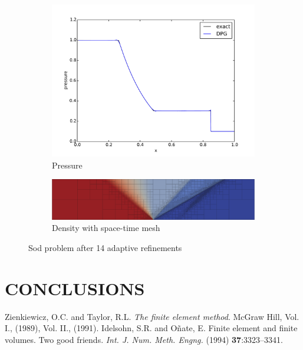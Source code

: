\documentclass{parcfd2014}
\begin{document}
\begin{figure}[h]
\begin{subfigure}[c]{0.3\textwidth}
\includegraphics[width=\textwidth]{figs/Sod1e-5/pres15.pdf}
\caption{Pressure}
\label{fig:sod_pres14}
\end{subfigure}
\begin{subfigure}[c]{0.9\textwidth}
\centering
\includegraphics[width=\textwidth]{figs/Sod1e-5/mesh15.png}
\caption{Density with space-time mesh}
\label{fig:sod_mesh14}
\end{subfigure}
\caption{Sod problem after 14 adaptive refinements}
\label{fig:sod}
\end{figure}


\section{CONCLUSIONS}



\begin{thebibliography}{99}
  Zienkiewicz, O.C. and  Taylor, R.L. \textit{The finite element method}. McGraw Hill,
Vol. I., (1989), Vol. II., (1991).
 Idelsohn, S.R. and O\~{n}ate, E. Finite element and finite volumes. Two good friends.
\textit{Int. J. Num. Meth. Engng.} (1994) \textbf{37}:3323--3341.
\end{thebibliography}
\end{document}

